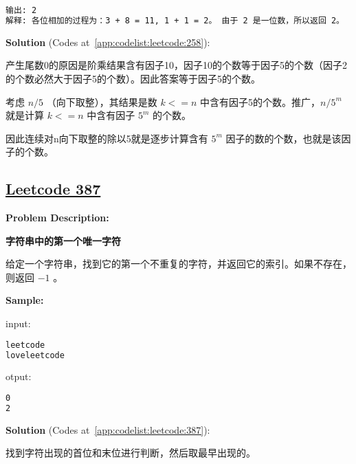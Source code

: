 \begin{lstlisting}[language=bash]
输出: 2
解释: 各位相加的过程为：3 + 8 = 11, 1 + 1 = 2。 由于 2 是一位数，所以返回 2。
\end{lstlisting}

\textbf{Solution }(Codes at~\ref{app:codelist:leetcode:258}):\par

产生尾数0的原因是阶乘结果含有因子10，因子10的个数等于因子5的个数（因子2的个数必然大于因子5的个数）。因此答案等于因子5的个数。\par

考虑 $n/5$ （向下取整），其结果是数 $k<=n$ 中含有因子5的个数。推广，$n/5^{m}$ 就是计算 $k<=n$ 中含有因子 $5^{m}$ 的个数。\par

因此连续对n向下取整的除以5就是逐步计算含有 $5^{m}$ 因子的数的个数，也就是该因子的个数。\par



\subsection{\href{https://leetcode-cn.com/}{Leetcode 387}}\label{app:problemlist:leetcode:387}

\textbf{Problem Description:}\par

\textbf{字符串中的第一个唯一字符}\par

给定一个字符串，找到它的第一个不重复的字符，并返回它的索引。如果不存在，则返回 $ -1 $ 。\par


\textbf{Sample:}\par

input:\par

\begin{lstlisting}[language=bash]
leetcode
loveleetcode
\end{lstlisting}

otput:\par

\begin{lstlisting}[language=bash]
0
2
\end{lstlisting}

\textbf{Solution }(Codes at~\ref{app:codelist:leetcode:387}):\par

找到字符出现的首位和末位进行判断，然后取最早出现的。\par



